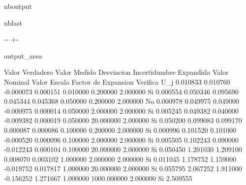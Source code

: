 \documentclass[letterpaper,10pt,english]{sphinxmanual}
\begin{document}
\begin{sphinxuseclass}{nboutput}
\begin{sphinxuseclass}{nblast}
{

\kern-\sphinxverbatimsmallskipamount\kern-\baselineskip
\kern+\FrameHeightAdjust\kern-\fboxrule
\vspace{\nbsphinxcodecellspacing}

\begin{sphinxuseclass}{output_area}
\begin{sphinxuseclass}{}


\begin{sphinxVerbatim}[commandchars=\\\{\}]
Valor Verdadero      Valor Medido         Desviacion           Incertidumbre Expandida   Valor Nominal        Valor Escala         Factor de Expansion  Verifica        U\_j
0.010833             0.010760             -0.000073            0.000151                  0.010000             0.200000             2.000000             Si              0.000554
0.050346             0.095690             0.045344             0.045368                  0.050000             0.200000             2.000000             No              0.000978
0.049975             0.049000             -0.000975            0.000014                  0.050000             2.000000             2.000000             Si              0.005245
0.049382             0.040000             -0.009382            0.000019                  0.050000             20.000000            2.000000             Si              0.050200
0.099083             0.099170             0.000087             0.000086                  0.100000             0.200000             2.000000             Si              0.000996
0.101520             0.101000             -0.000520            0.000096                  0.100000             2.000000             2.000000             Si              0.005505
0.102243             0.090000             -0.012243            0.000104                  0.100000             20.000000            2.000000             Si              0.050450
1.201030             1.209100             0.008070             0.003102                  1.000000             2.000000             2.000000             Si              0.011045
1.178752             1.159000             -0.019752            0.017817                  1.000000             20.000000            2.000000             Si              0.055795
2.067252             1.911000             -0.156252            1.271667                  1.000000             1000.000000          2.000000             Si              2.509555

\end{sphinxVerbatim}
\end{sphinxuseclass}
\end{sphinxuseclass}}
\end{sphinxuseclass}
\end{sphinxuseclass}
\end{document}
